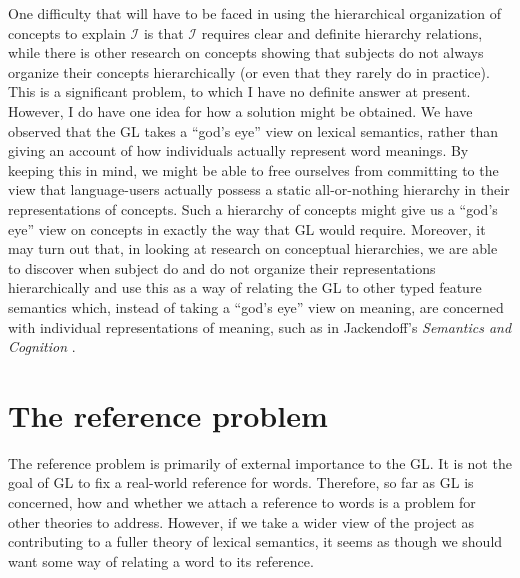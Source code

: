 \documentclass[12pt]{amsart}
\begin{document}
One difficulty that will have to be faced in using the hierarchical organization of concepts to explain $\mathcal{I}$ is that $\mathcal{I}$ requires clear and definite hierarchy relations, while there is other research on concepts showing that subjects do not always organize their concepts hierarchically (or even that they rarely do in practice). This is a significant problem, to which I have no definite answer at present. However, I do have one idea for how a solution might be obtained. We have observed that the GL takes a ``god's eye'' view on lexical semantics, rather than giving an account of how individuals actually represent word meanings. By keeping this in mind, we might be able to free ourselves from committing to the view that language-users actually possess a static all-or-nothing hierarchy in their representations of concepts. Such a hierarchy of concepts might give us a ``god's eye'' view on concepts in exactly the way that GL would require. Moreover, it may turn out that, in looking at research on conceptual hierarchies, we are able to discover when subject do and do not organize their representations hierarchically and use this as a way of relating the GL to other typed feature semantics which, instead of taking a ``god's eye'' view on meaning, are concerned with individual representations of meaning, such as in Jackendoff's \emph{Semantics and Cognition} \cite{Jackendoff83}.

\section{The reference problem}

The reference problem is primarily of external importance to the GL. It is not the goal of GL to fix a real-world reference for words. Therefore, so far as GL is concerned, how and whether we attach a reference to words is a problem for other theories to address. However, if we take a wider view of the project as contributing to a fuller theory of lexical semantics, it seems as though we should want some way of relating a word to its reference.
\end{document}
